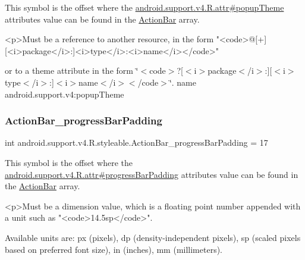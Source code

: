 This symbol is the offset where the \hyperlink{classandroid_1_1support_1_1v4_1_1R_1_1attr_a05446418402decb6877749b6de8bc2d8}{android.\+support.\+v4.\+R.\+attr\#popup\+Theme} attribute\textquotesingle{}s value can be found in the \hyperlink{classandroid_1_1support_1_1v4_1_1R_1_1styleable_adc5a3492b9c46265760d7120a04d6afa}{Action\+Bar} array.

\begin{DoxyVerb}      <p>Must be a reference to another resource, in the form "<code>@[+][<i>package</i>:]<i>type</i>:<i>name</i></code>"
\end{DoxyVerb}
 or to a theme attribute in the form \char`\"{}$<$code$>$?\mbox{[}$<$i$>$package$<$/i$>$\+:\mbox{]}\mbox{[}$<$i$>$type$<$/i$>$\+:\mbox{]}$<$i$>$name$<$/i$>$$<$/code$>$\char`\"{}.  name android.\+support.\+v4\+:popup\+Theme \mbox{\label{classandroid_1_1support_1_1v4_1_1R_1_1styleable_abfc806e138832b59961a03dd3ea028a5}} 
\subsubsection{\texorpdfstring{Action\+Bar\+\_\+progress\+Bar\+Padding}{ActionBar\_progressBarPadding}}
{\footnotesize\ttfamily int android.\+support.\+v4.\+R.\+styleable.\+Action\+Bar\+\_\+progress\+Bar\+Padding = 17\hspace{0.3cm}{\ttfamily [static]}}

This symbol is the offset where the \hyperlink{classandroid_1_1support_1_1v4_1_1R_1_1attr_a2f33b6b0b1c10888283153513a2d5f7b}{android.\+support.\+v4.\+R.\+attr\#progress\+Bar\+Padding} attribute\textquotesingle{}s value can be found in the \hyperlink{classandroid_1_1support_1_1v4_1_1R_1_1styleable_adc5a3492b9c46265760d7120a04d6afa}{Action\+Bar} array.

\begin{DoxyVerb}      <p>Must be a dimension value, which is a floating point number appended with a unit such as "<code>14.5sp</code>".
\end{DoxyVerb}
 Available units are\+: px (pixels), dp (density-\/independent pixels), sp (scaled pixels based on preferred font size), in (inches), mm (millimeters). 

